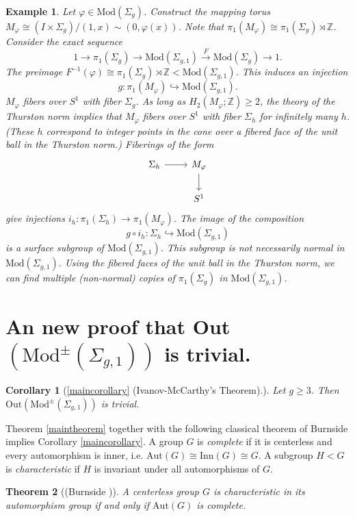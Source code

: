 \documentclass[a4paper]{amsproc}
\theoremstyle{TheoremNum}
\newtheorem{corn}{Corollary}
\theoremstyle{Theorembold}
\newtheorem{thm}{Theorem}[section]
\theoremstyle{TheoremboldDef}
\newtheorem{exm}[thm]{Example}
\theoremstyle{TheoremboldRem}
\theoremstyle{TheoremboldRem}
\begin{document}
    \begin{exm}\label{example}
    Let $\varphi\in{\text{Mod}(\Sigma_g)}$. Construct the mapping torus $M_\varphi\cong (I\times \Sigma_g)/(1,x)\sim(0,\varphi(x))$. Note that $\pi_1(M_\varphi)\cong {\pi_1(\Sigma_g)}\rtimes{\mathbb{Z}}$. Consider the exact sequence \[1\longrightarrow {\pi_1(\Sigma_g)}\longrightarrow{\text{Mod}(\Sigma_{g,1})}\stackrel{F}{\longrightarrow} {\text{Mod}(\Sigma_g)}\longrightarrow 1.\] The preimage $F^{-1}(\varphi)\cong{\pi_1(\Sigma_g)}\rtimes{\mathbb{Z}}<{\text{Mod}(\Sigma_{g,1})}$. This induces an injection \[g:\pi_1(M_\varphi)\hookrightarrow{\text{Mod}(\Sigma_{g,1})}.\] $M_\varphi$ fibers over $S^1$ with fiber $\Sigma_g$. 
     As long as $H_2(M_\varphi;{\mathbb{Z}}){\geqslant} 2$, the theory of the Thurston norm \cite{thurston} implies that $M_\varphi$ fibers over $S^1$ with fiber $\Sigma_h$ for infinitely many $h$. (These $h$ correspond to integer points in the cone over a fibered face of the unit ball in the Thurston norm.) Fiberings of the form
     \[
    \begin{tikzcd}
    \Sigma_h\arrow{r}{}& M_\varphi\arrow{d}\\
    & S^1
    \end{tikzcd}
    \]
    give injections $i_h:\pi_1(\Sigma_h)\to \pi_1(M_\varphi)$. The image of the composition \[g\circ i_h:\Sigma_h\hookrightarrow{\text{Mod}(\Sigma_{g,1})}\] is a surface subgroup of ${\text{Mod}(\Sigma_{g,1})}$. This subgroup is not necessarily normal in ${\text{Mod}(\Sigma_{g,1})}$. Using the fibered faces of the unit ball in the Thurston norm, we can find multiple (non-normal) copies of ${\pi_1(\Sigma_g)}$ in ${\text{Mod}(\Sigma_{g,1})}$.\\

    \end{exm}
    

\section{An new proof that Out$({\text{Mod}^\pm(\Sigma_{g,1})})$ is trivial.}\label{burnsec} 

\begin{corn}[\ref{maincorollary} (Ivanov-McCarthy's Theorem).]
Let $g{\geqslant} 3$. Then $\text{Out}({\text{Mod}^\pm(\Sigma_{g,1})})$ is trivial.
\end{corn}

Theorem \ref{maintheorem} together with the following classical theorem of Burnside implies Corollary \ref{maincorollary}. A group $G$ is \emph{complete} if it is centerless and every automorphism is inner, i.e. $\text{Aut}(G)\cong \text{Inn}(G)\cong G$. A subgroup $H< G$ is \emph{characteristic} if $H$ is invariant under all automorphisms of $G$.
\begin{thm}[(Burnside \cite{burnside})]\label{burn} A centerless group $G$ is characteristic in its automorphism group if and only if $\text{Aut}(G)$ is complete.
\end{thm}
\end{document}
